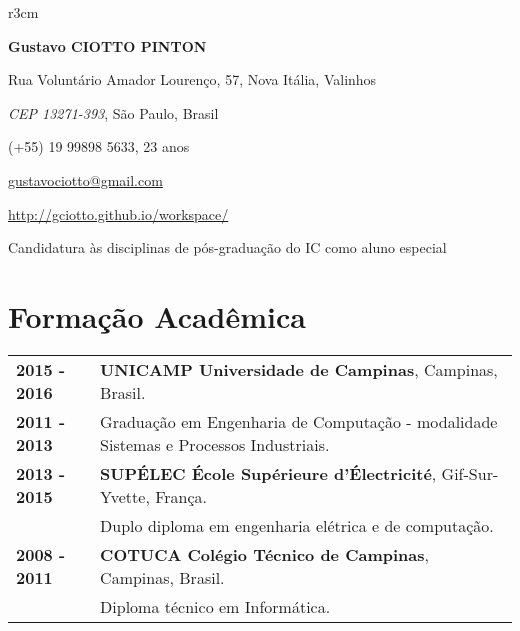 \documentclass[10pt, a4paper]{article}
\author{Gustavo Ciotto Pinton}
\begin{document}
\pagestyle{empty}

\begin{wrapfigure}{r}{3cm}
\vspace{-20pt}
\begin{center}
\end{center}
\end{wrapfigure}

\textbf{\LARGE Gustavo CIOTTO PINTON}

Rua Voluntário Amador Lourenço, 57, Nova Itália, Valinhos

\textit{CEP 13271-393}, São Paulo, Brasil

(+55) 19 99898 5633, 23 anos

\url{gustavociotto@gmail.com}

\url{http://gciotto.github.io/workspace/}

\vspace{8pt}

{\centerline {\large Candidatura às disciplinas de pós-graduação do IC como
aluno especial }}



\section{Formação Acadêmica}

\begin{tabular}{p{} p{}}

\textbf{2015 - 2016} & \textbf{UNICAMP Universidade de Campinas}, Campinas,
Brasil.
\\
\textbf{2011 - 2013} & Graduação em Engenharia de Computação - modalidade
Sistemas e Processos Industriais. \vspace{8pt}\\

\textbf{2013 - 2015} & \textbf{SUPÉLEC  École Supérieure d'Électricité},
Gif-Sur-Yvette, França. \\
& Duplo diploma em  engenharia elétrica e de computação. \vspace{8pt} \\

\textbf{2008 - 2011} & \textbf{COTUCA Colégio Técnico de Campinas}, Campinas,
Brasil. \\
& Diploma técnico em Informática. \\
\end{tabular}
\end{document}
